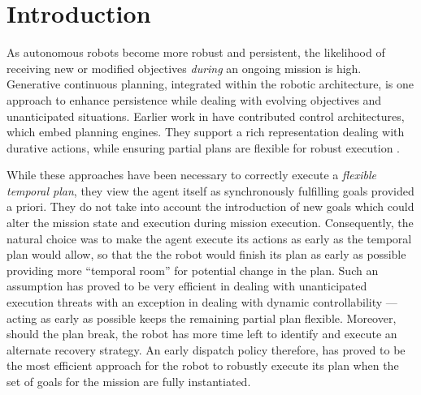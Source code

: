 \section{Introduction}
\label{sec:intro}

As autonomous robots become more robust and persistent, the likelihood
of receiving new or modified objectives \emph{during} an ongoing
mission is high. Generative continuous planning, integrated within the
robotic architecture, is one approach to enhance persistence while
dealing with evolving objectives and unanticipated situations.
Earlier work in
\cite{AmbrosIngerson88,Haigh98,alami:1998p820,mus98,chien99,mus04,py10}
have contributed control architectures, which embed planning engines.
They support a rich representation dealing with durative actions,
while ensuring partial plans are flexible for robust execution
\cite{lemai-chenevier2004}.


While these approaches have been necessary to correctly execute a
\emph{flexible temporal plan}, they view the agent itself as
synchronously fulfilling goals provided a priori. They do not take
into account the introduction of new goals which could alter the
mission state and execution during mission execution.  Consequently,
the natural choice was to make the agent execute its actions as early
as the temporal plan would allow, so that the the robot would finish
its plan as early as possible providing more ``temporal room'' for
potential change in the plan. Such an assumption has proved to be very
efficient in dealing with unanticipated execution threats with an
exception in dealing with dynamic controllability \cite{morris01} ---
acting as early as possible keeps the remaining partial plan
flexible. Moreover, should the plan break, the robot has more time
left to identify and execute an alternate recovery strategy. An early
dispatch policy therefore, has proved to be the most efficient
approach for the robot to robustly execute its plan when the set of
goals for the mission are fully instantiated.

